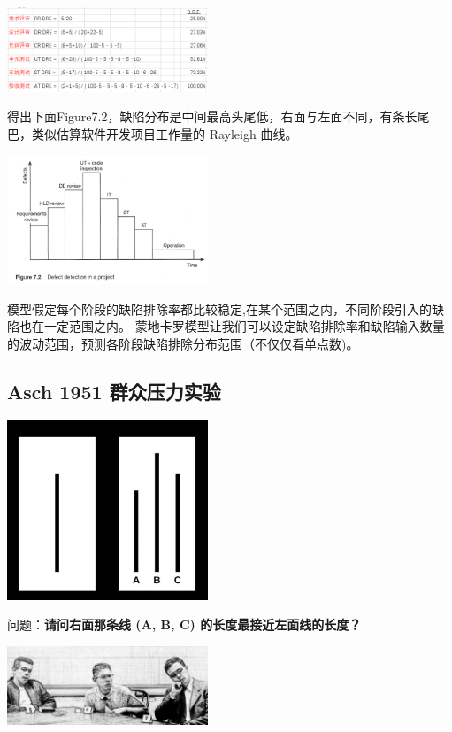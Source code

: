 \includegraphics[width=6cm]{1113corrDreScreenshot_2021-11-13_212509.png}

得出下面Figure7.2，缺陷分布是中间最高头尾低，右面与左面不同，有条长尾巴，类似估算软件开发项目工作量的
Rayleigh 曲线。

\includegraphics[width=6cm]{jalote_emm_72.png}

模型假定每个阶段的缺陷排除率都比较稳定,在某个范围之内，不同阶段引入的缺陷也在一定范围之内。
蒙地卡罗模型让我们可以设定缺陷排除率和缺陷输入数量的波动范围，预测各阶段缺陷排除分布范围（不仅仅看单点数)。

\hypertarget{asch-1951-ux7fa4ux4f17ux538bux529bux5b9eux9a8c}{%
\subsection{Asch 1951
群众压力实验}\label{asch-1951-ux7fa4ux4f17ux538bux529bux5b9eux9a8c}}

\includegraphics[width=6cm]{Asch0Screenshot_2022-07-09_161023.jpg}

问题：\textbf{请问右面那条线 (A, B, C) 的长度最接近左面线的长度？}

\includegraphics[width=6cm]{Asch2Screenshot2.png}

